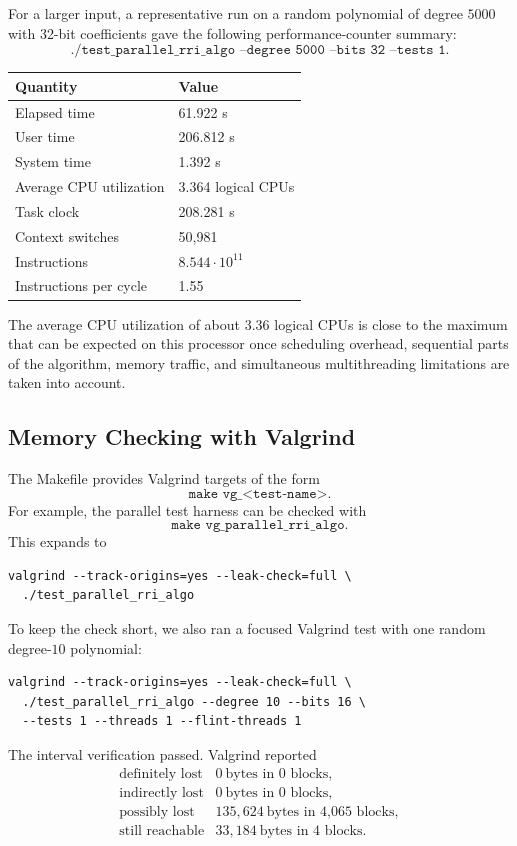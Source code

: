 \documentclass[letterpaper]{article}
\begin{document}
For a larger input, a representative run on a random polynomial of degree
$5000$ with 32-bit coefficients gave the following performance-counter
summary:
\[
  \texttt{./test\_parallel\_rri\_algo --degree 5000 --bits 32 --tests 1}.
\]

\begin{center}
\begin{tabular}{ll}
\toprule
Quantity & Value \\
\midrule
Elapsed time & 61.922 s \\
User time & 206.812 s \\
System time & 1.392 s \\
Average CPU utilization & 3.364 logical CPUs \\
Task clock & 208.281 s \\
Context switches & 50,981 \\
Instructions & $8.544 \cdot 10^{11}$ \\
Instructions per cycle & 1.55 \\
\bottomrule
\end{tabular}
\end{center}

The average CPU utilization of about $3.36$ logical CPUs is close to the
maximum that can be expected on this processor once scheduling overhead,
sequential parts of the algorithm, memory traffic, and simultaneous
multithreading limitations are taken into account.

\subsection{Memory Checking with Valgrind}

The Makefile provides Valgrind targets of the form
\[
  \texttt{make vg\_<test-name>}.
\]
For example, the parallel test harness can be checked with
\[
  \texttt{make vg\_parallel\_rri\_algo}.
\]
This expands to
\begin{lstlisting}
valgrind --track-origins=yes --leak-check=full \
  ./test_parallel_rri_algo
\end{lstlisting}

To keep the check short, we also ran a focused Valgrind test with one random
degree-$10$ polynomial:
\begin{lstlisting}
valgrind --track-origins=yes --leak-check=full \
  ./test_parallel_rri_algo --degree 10 --bits 16 \
  --tests 1 --threads 1 --flint-threads 1
\end{lstlisting}
The interval verification passed. Valgrind reported
\[
\begin{array}{ll}
\text{definitely lost} & 0\ \text{bytes in 0 blocks},\\
\text{indirectly lost} & 0\ \text{bytes in 0 blocks},\\
\text{possibly lost} & 135{,}624\ \text{bytes in 4{,}065 blocks},\\
\text{still reachable} & 33{,}184\ \text{bytes in 4 blocks}.
\end{array}
\]
\end{document}
